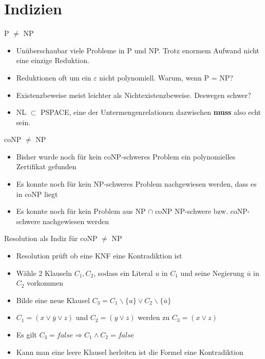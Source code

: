 \documentclass[ignorenonframetext,]{beamer}
\begin{document}
\section{Indizien}\label{indizien}

\begin{frame}{P $\neq$ NP}

\begin{itemize}
\itemsep1pt\parskip0pt
\item
  Unüberschaubar viele Probleme in P und NP. Trotz enormem Aufwand nicht
  eine einzige Reduktion.
\item
  Reduktionen oft um ein $\varepsilon$ nicht polynomiell. Warum, wenn P
  = NP?
\item
  Existenzbeweise meist leichter als Nichtexistenzbeweise. Deswegen
  schwer?
\item
  NL $\subset$ PSPACE, eine der Untermengenrelationen dazwischen
  \textbf{muss} also echt sein.
\end{itemize}

\end{frame}

\begin{frame}{coNP $\neq$ NP}

\begin{itemize}
\itemsep1pt\parskip0pt
\item
  Bisher wurde noch für kein coNP-schweres Problem ein polynomielles
  Zertifikat gefunden
\item
  Es konnte noch für kein NP-schweres Problem nachgewiesen werden, dass
  es in coNP liegt
\item
  Es konnte noch für kein Problem aus NP $\cap$ coNP NP-schwere bzw.
  coNP-schwere nachgewiesen werden
\end{itemize}

\end{frame}

\begin{frame}{Resolution als Indiz für coNP $\neq$ NP}

\begin{itemize}
\itemsep1pt\parskip0pt
\item
  Resolution prüft ob eine KNF eine Kontradiktion ist
\item
  Wähle 2 Klauseln $C_1, C_2$, sodass ein Literal $u$ in $C_1$ und seine
  Negierung $\overline{u}$ in $C_2$ vorkommen
\item
  Bilde eine neue Klausel
  $C_3 = C_1 \backslash \{u\} \vee C_2 \backslash \{\overline{u}\}$
\item
  $C_1 = (x \vee \overline{y} \vee z)$ und $C_2 = (y \vee z)$ werden zu
  $C_3 = (x \vee z)$
\item
  Es gilt $C_3 = false \Rightarrow C_1 \wedge C_2 = false$
\item
  Kann man eine leere Klausel herleiten ist die Formel eine
  Kontradiktion
\end{itemize}

\end{frame}
\end{document}

